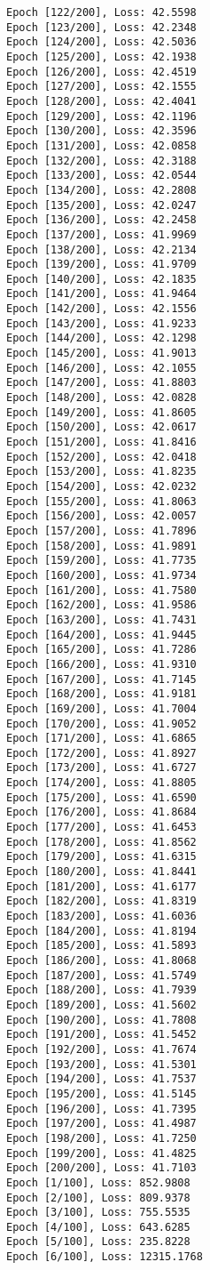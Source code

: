 \documentclass[11pt]{article}
\begin{document}
\begin{Verbatim}[commandchars=\\\{\}]
Epoch [122/200], Loss: 42.5598
Epoch [123/200], Loss: 42.2348
Epoch [124/200], Loss: 42.5036
Epoch [125/200], Loss: 42.1938
Epoch [126/200], Loss: 42.4519
Epoch [127/200], Loss: 42.1555
Epoch [128/200], Loss: 42.4041
Epoch [129/200], Loss: 42.1196
Epoch [130/200], Loss: 42.3596
Epoch [131/200], Loss: 42.0858
Epoch [132/200], Loss: 42.3188
Epoch [133/200], Loss: 42.0544
Epoch [134/200], Loss: 42.2808
Epoch [135/200], Loss: 42.0247
Epoch [136/200], Loss: 42.2458
Epoch [137/200], Loss: 41.9969
Epoch [138/200], Loss: 42.2134
Epoch [139/200], Loss: 41.9709
Epoch [140/200], Loss: 42.1835
Epoch [141/200], Loss: 41.9464
Epoch [142/200], Loss: 42.1556
Epoch [143/200], Loss: 41.9233
Epoch [144/200], Loss: 42.1298
Epoch [145/200], Loss: 41.9013
Epoch [146/200], Loss: 42.1055
Epoch [147/200], Loss: 41.8803
Epoch [148/200], Loss: 42.0828
Epoch [149/200], Loss: 41.8605
Epoch [150/200], Loss: 42.0617
Epoch [151/200], Loss: 41.8416
Epoch [152/200], Loss: 42.0418
Epoch [153/200], Loss: 41.8235
Epoch [154/200], Loss: 42.0232
Epoch [155/200], Loss: 41.8063
Epoch [156/200], Loss: 42.0057
Epoch [157/200], Loss: 41.7896
Epoch [158/200], Loss: 41.9891
Epoch [159/200], Loss: 41.7735
Epoch [160/200], Loss: 41.9734
Epoch [161/200], Loss: 41.7580
Epoch [162/200], Loss: 41.9586
Epoch [163/200], Loss: 41.7431
Epoch [164/200], Loss: 41.9445
Epoch [165/200], Loss: 41.7286
Epoch [166/200], Loss: 41.9310
Epoch [167/200], Loss: 41.7145
Epoch [168/200], Loss: 41.9181
Epoch [169/200], Loss: 41.7004
Epoch [170/200], Loss: 41.9052
Epoch [171/200], Loss: 41.6865
Epoch [172/200], Loss: 41.8927
Epoch [173/200], Loss: 41.6727
Epoch [174/200], Loss: 41.8805
Epoch [175/200], Loss: 41.6590
Epoch [176/200], Loss: 41.8684
Epoch [177/200], Loss: 41.6453
Epoch [178/200], Loss: 41.8562
Epoch [179/200], Loss: 41.6315
Epoch [180/200], Loss: 41.8441
Epoch [181/200], Loss: 41.6177
Epoch [182/200], Loss: 41.8319
Epoch [183/200], Loss: 41.6036
Epoch [184/200], Loss: 41.8194
Epoch [185/200], Loss: 41.5893
Epoch [186/200], Loss: 41.8068
Epoch [187/200], Loss: 41.5749
Epoch [188/200], Loss: 41.7939
Epoch [189/200], Loss: 41.5602
Epoch [190/200], Loss: 41.7808
Epoch [191/200], Loss: 41.5452
Epoch [192/200], Loss: 41.7674
Epoch [193/200], Loss: 41.5301
Epoch [194/200], Loss: 41.7537
Epoch [195/200], Loss: 41.5145
Epoch [196/200], Loss: 41.7395
Epoch [197/200], Loss: 41.4987
Epoch [198/200], Loss: 41.7250
Epoch [199/200], Loss: 41.4825
Epoch [200/200], Loss: 41.7103
Epoch [1/100], Loss: 852.9808
Epoch [2/100], Loss: 809.9378
Epoch [3/100], Loss: 755.5535
Epoch [4/100], Loss: 643.6285
Epoch [5/100], Loss: 235.8228
Epoch [6/100], Loss: 12315.1768

\end{Verbatim}
\end{document}
